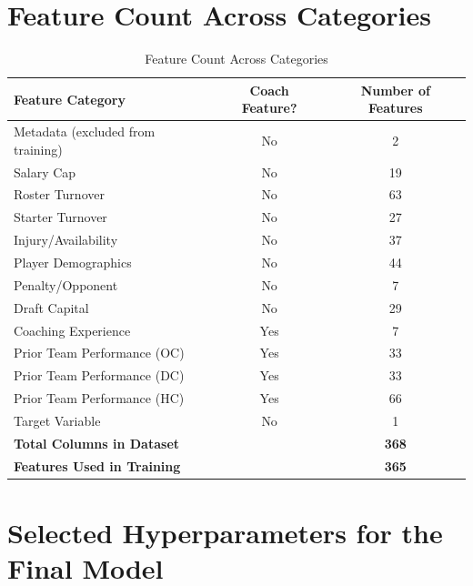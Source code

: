 \documentclass[USenglish]{article}
\theoremstyle{dgthm}
\theoremstyle{dgdef}
\begin{document}
\clearpage

\appendix

\section{Feature Count Across Categories}

\begin{table}[!ht]
\caption{Feature Count Across Categories}
\label{tab:feature_counts}
\begin{tabular}{lcc}
\toprule
Feature Category & Coach Feature? & Number of Features \\
\midrule
Metadata (excluded from training) & No & 2 \\
Salary Cap & No & 19 \\
Roster Turnover & No & 63 \\
Starter Turnover & No & 27 \\
Injury/Availability & No & 37 \\
Player Demographics & No & 44 \\
Penalty/Opponent & No & 7 \\
Draft Capital & No & 29 \\
Coaching Experience & Yes & 7 \\
Prior Team Performance (OC) & Yes & 33 \\
Prior Team Performance (DC) & Yes & 33 \\
Prior Team Performance (HC) & Yes & 66 \\
Target Variable & No & 1 \\
\midrule
\textbf{Total Columns in Dataset} & & \textbf{368} \\
\textbf{Features Used in Training} & & \textbf{365} \\
\bottomrule
\end{tabular}
\end{table}

\clearpage

\section{Selected Hyperparameters for the Final Model}
\end{document}
